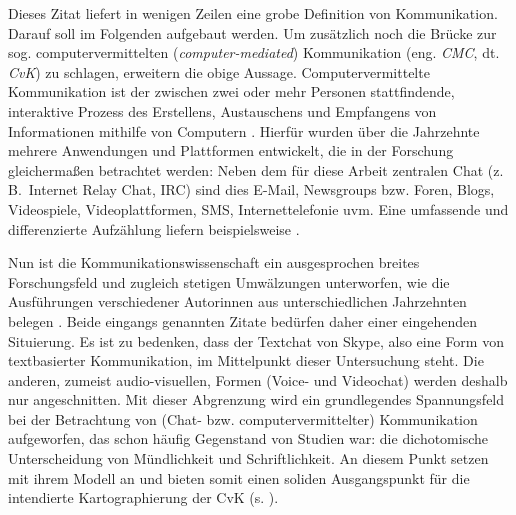 Dieses Zitat liefert in wenigen Zeilen eine grobe Definition von Kommunikation. Darauf soll im Folgenden aufgebaut werden. Um zusätzlich noch die Brücke zur sog. computervermittelten (\emph{computer-mediated}) Kommunikation (eng. \emph{CMC}, dt. \emph{CvK}) zu schlagen, erweitern \citeauthor{trepte_medienpsychologie_2012} die obige Aussage. Computervermittelte Kommunikation ist der \glqq zwischen zwei oder mehr Personen stattfindende, interaktive Prozess des Erstellens, Austauschens und Empfangens von Informationen mithilfe von Computern\grqq{} \citep[158]{trepte_medienpsychologie_2012}. Hierfür wurden über die Jahrzehnte mehrere Anwendungen und Plattformen entwickelt, die in der Forschung gleichermaßen betrachtet werden: Neben dem für diese Arbeit zentralen Chat (z.\,B.\ Internet Relay Chat, IRC) sind dies E-Mail, Newsgroups bzw. Foren, Blogs, Videospiele, Videoplattformen, SMS, Internettelefonie uvm. Eine umfassende und differenzierte Aufzählung liefern beispielsweise \citep[beispielsweise][]{beck_computervermittelte_2006, misoch_online-kommunikation_2006}.

\begin{sloppypar}
Nun ist die Kommunikationswissenschaft ein ausgesprochen breites Forschungsfeld und zugleich stetigen Umwälzungen unterworfen, wie die Ausführungen verschiedener Autor{\textperiodcentered}innen aus unterschiedlichen Jahrzehnten belegen \citep[z.\,B.][]{doring_sozialpsychologie_2003, beiswenger_sprachhandlungskoordination_2007, durscheid_personale_2018, storrer_sprachliche_2001, beiswenger_eyetracking_2017, baechler_medienlinguistik_2016}. Beide eingangs genannten Zitate bedürfen daher einer eingehenden Situierung. Es ist zu bedenken, dass der Textchat von Skype, also eine Form von textbasierter Kommunikation, im Mittelpunkt dieser Untersuchung steht. Die anderen, zumeist audio-visuellen, Formen (Voice- und Videochat) werden deshalb nur angeschnitten. Mit dieser Abgrenzung wird ein grundlegendes Spannungsfeld bei der Betrachtung von (Chat- bzw. computervermittelter) Kommunikation aufgeworfen, das schon häufig Gegenstand von Studien war: die dichotomische Unterscheidung von Mündlichkeit und Schriftlichkeit. An diesem Punkt setzen \citet[][13]{koch_gesprochene_2011} mit ihrem Modell an und bieten somit einen soliden Ausgangspunkt für die intendierte Kartographierung der CvK (s. ).
\end{sloppypar}

